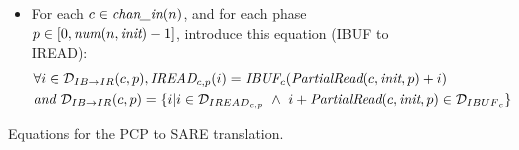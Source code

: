 \begin{figure}[t]
{\begin{minipage}{6.3in}
\begin{itemize}
introduce this equation (SWRITE to SBUF):
\begin{align}
&\forall (i,j) \in {\cal D}_{SW {\small \rightarrow} SB}(c,p,q),
\mt{SBUF}_{c}(i,j) = \\
&  \mt{SWRITE}_{c, p}(i, q,
                     j - \mt{Offset}_{SW {\small \rightarrow} SB}(q,n,c,p)),
\mt{where } \nonumber\\&{\cal D}_{SW {\small \rightarrow} SB}(c,p,q) = 
  {\cal D}_{{SBUF}_{c}} \cap 
  \{ (i,j) | \mt{Offset}_{SW {\small \rightarrow} SB}(q,n,c,p) \le j
             \le \mt{Offset}_{SW {\small \rightarrow} SB}(q,n,c,p+1) - 1 \} \nonumber\\\nonumber
&\mt{and } \mt{Offset}_{SW {\small \rightarrow} SB}(q,n,c,p') = q*\mt{TotalWrite}(n,c,\mt{steady}) + \mt{PartialWrite}(c,\mt{steady},p'))
\end{align}
%
\item For each $c \in \mbox{\it chan\_in}(n)$, and for each phase $p \in
[0, \mbox{\it num}(n, \mbox{\it init})-1]$, introduce this equation (IBUF to IREAD):
\begin{align}
&\forall i \in {\cal D}_{IB {\small \rightarrow} IR}(c,p), 
\mbox{\it IREAD}_{c, p}(i) = \mbox{\it IBUF}_{c}(\mbox{\it PartialRead}(c, \mbox{\it init}, p) + i) \\ \nonumber
&\mbox{\it and }{\cal D}_{IB {\small \rightarrow} IR}(c,p) = 
  \{ i | i \in {\cal D}_{{IREAD}_{c,p}} ~\wedge~ 
         i + \mbox{\it PartialRead}(c, \mbox{\it init}, p) \in {\cal D}_{{IBUF}_{c}} \}
\end{align}
%
\end{itemize}
\end{minipage}}
\caption{Equations for the PCP to SARE translation.
\protect\label{fig:pcptosare2}}
\end{figure}

